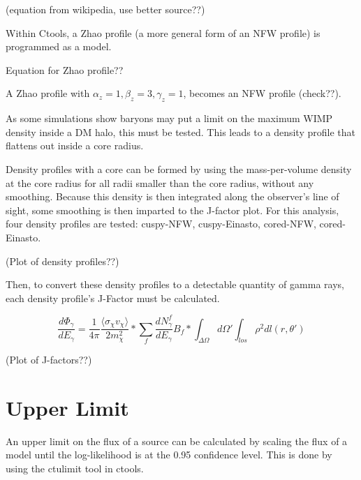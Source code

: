   (equation from wikipedia, use better source??)

  Within Ctools, a Zhao profile (a more general form of an NFW profile) is programmed as a model.

  Equation for Zhao profile??

  A Zhao profile with $ \alpha_{z} = 1 , \beta_{z} = 3 , \gamma_{z} = 1 $, becomes an NFW profile (check??).

  As some simulations show baryons may put a limit on the maximum WIMP density inside a DM halo, this must be tested.
  This leads to a density profile that flattens out inside a core radius.

  Density profiles with a core can be formed by using the mass-per-volume density at the core radius for all radii smaller than the core radius, without any smoothing.
  Because this density is then integrated along the observer's line of sight, some smoothing is then imparted to the J-factor plot.
  For this analysis, four density profiles are tested: cuspy-NFW, cuspy-Einasto, cored-NFW, cored-Einasto.

  (Plot of density profiles??)


  Then, to convert these density profiles to a detectable quantity of gamma rays, each density profile's J-Factor must be calculated.


  \begin{equation} \label{eqn:jfactor}
  \frac{d \Phi_{\gamma}}{d E_{\gamma}} = \frac{1}{4\pi} \frac{ \langle \sigma_{\chi} v_{\chi} \rangle }{2 m^{2}_{\chi}} * \sum_{f} \frac{ d N_{\gamma}^{f} }{d E_{\gamma} } B_{f} * \int_{ \Delta \Omega } d \Omega' \int_{los} \rho^{2} d l( r, \theta' )
  \end{equation}


  (Plot of J-factors??)

  
\section{Upper Limit}
  An upper limit on the flux of a source can be calculated by scaling the flux of a model until the log-likelihood is at the 0.95 confidence level.
  This is done by using the ctulimit tool in ctools.
  
